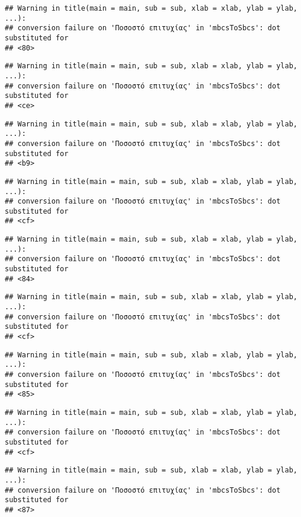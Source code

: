\documentclass[
]{article}
\begin{document}
\begin{verbatim}
## Warning in title(main = main, sub = sub, xlab = xlab, ylab = ylab, ...):
## conversion failure on 'Ποσοστό επιτυχίας' in 'mbcsToSbcs': dot substituted for
## <80>
\end{verbatim}

\begin{verbatim}
## Warning in title(main = main, sub = sub, xlab = xlab, ylab = ylab, ...):
## conversion failure on 'Ποσοστό επιτυχίας' in 'mbcsToSbcs': dot substituted for
## <ce>
\end{verbatim}

\begin{verbatim}
## Warning in title(main = main, sub = sub, xlab = xlab, ylab = ylab, ...):
## conversion failure on 'Ποσοστό επιτυχίας' in 'mbcsToSbcs': dot substituted for
## <b9>
\end{verbatim}

\begin{verbatim}
## Warning in title(main = main, sub = sub, xlab = xlab, ylab = ylab, ...):
## conversion failure on 'Ποσοστό επιτυχίας' in 'mbcsToSbcs': dot substituted for
## <cf>
\end{verbatim}

\begin{verbatim}
## Warning in title(main = main, sub = sub, xlab = xlab, ylab = ylab, ...):
## conversion failure on 'Ποσοστό επιτυχίας' in 'mbcsToSbcs': dot substituted for
## <84>
\end{verbatim}

\begin{verbatim}
## Warning in title(main = main, sub = sub, xlab = xlab, ylab = ylab, ...):
## conversion failure on 'Ποσοστό επιτυχίας' in 'mbcsToSbcs': dot substituted for
## <cf>
\end{verbatim}

\begin{verbatim}
## Warning in title(main = main, sub = sub, xlab = xlab, ylab = ylab, ...):
## conversion failure on 'Ποσοστό επιτυχίας' in 'mbcsToSbcs': dot substituted for
## <85>
\end{verbatim}

\begin{verbatim}
## Warning in title(main = main, sub = sub, xlab = xlab, ylab = ylab, ...):
## conversion failure on 'Ποσοστό επιτυχίας' in 'mbcsToSbcs': dot substituted for
## <cf>
\end{verbatim}

\begin{verbatim}
## Warning in title(main = main, sub = sub, xlab = xlab, ylab = ylab, ...):
## conversion failure on 'Ποσοστό επιτυχίας' in 'mbcsToSbcs': dot substituted for
## <87>
\end{verbatim}
\end{document}
